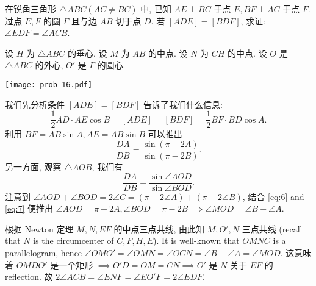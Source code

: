 \begin{prob}
\label{prob:prob-16}
在锐角三角形 $\triangle ABC (AC \ne BC)$ 中,
已知 $AE \perp BC$ 于点 $E, BF \perp AC$ 于点 $F$.
过点 $E, F$ 的圆 $\Gamma$ 且与边 $AB$ 切于点 $D$.
若 $[ADE] = [BDF]$, 求证: $\angle EDF = \angle ACB$.
\end{prob}

\begin{soln}
设 $H$ 为 $\triangle ABC$ 的垂心.
设 $M$ 为 $AB$ 的中点. 设 $N$ 为 $CH$ 的中点.
设 $O$ 是 $\triangle ABC$ 的外心, $O'$ 是 $\Gamma$ 的圆心.

\begin{center}
\texttt{[image: prob-16.pdf]}
\end{center}

我们先分析条件 $[ADE] = [BDF]$ 告诉了我们什么信息:
\[
\frac{1}{2}AD\cdot AE \cos B = [ADE]
= [BDF] = \frac{1}{2} BF\cdot BD \cos A.
\]
利用 $BF = AB \sin A, AE = AB\sin B$ 可以推出
\begin{equation}
\label{eq:6}
\frac{DA}{DB} = \frac{\sin(\pi - 2A)}{\sin(\pi - 2B)}.
\end{equation}
另一方面, 观察 $\triangle AOB$, 我们有
\begin{equation}
\label{eq:7}
\frac{DA}{DB} = \frac{\sin \angle AOD}{\sin \angle BOD}.
\end{equation}
注意到 $\angle AOD + \angle BOD = 2 \angle C =
(\pi - 2\angle A) + (\pi - 2\angle B)$, 结合 \cref{eq:6} and \cref{eq:7}
便推出 $\angle AOD = \pi - 2A, \angle BOD = \pi - 2B
\implies \angle MOD = \angle B - \angle A$.

\bigskip

根据 Newton 定理 $M, N, EF$ 的中点三点共线, 由此知
$M, O', N$ 三点共线 (recall that $N$ is the circumcenter of $C, F, H, E$).
It is well-known that $OMNC$ is a parallelogram, hence
$\angle OMO' = \angle OMN = \angle OCN = \angle B - \angle A = \angle MOD$.
这意味着 $OMDO'$ 是一个矩形 $\implies O'D = OM = CN \implies O'$
是 $N$ 关于 $EF$ 的 reflection.
故 $2 \angle ACB = \angle ENF = \angle EO'F = 2 \angle EDF$.
\end{soln}
